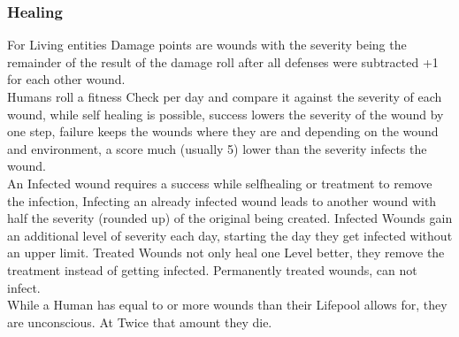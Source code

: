 \documentclass{article}
\begin{document}
    \subsubsection{Healing}
    For Living entities Damage points are wounds with the severity being the remainder of the result of the damage roll
    after all defenses were subtracted +1 for each other wound.\\
    Humans roll a fitness Check per day and compare it against the severity of each wound, while self healing is
    possible, success lowers the severity of the wound by one step, failure keeps the wounds where they are and
    depending on the wound and environment, a score much (usually 5) lower than the severity infects the wound.\\
    An Infected wound requires a success while selfhealing or treatment to remove the infection, Infecting an already
    infected wound leads to another wound with half the severity (rounded up) of the original being created. Infected
    Wounds gain an additional level of  severity each day, starting the day they get infected without an upper limit.
    Treated Wounds not only heal one Level better, they remove the treatment instead of getting infected. Permanently
    treated wounds, can not infect. \\
    While a Human has equal to or more wounds than their Lifepool allows for, they are unconscious. At Twice that amount
    they die.
\end{document}
